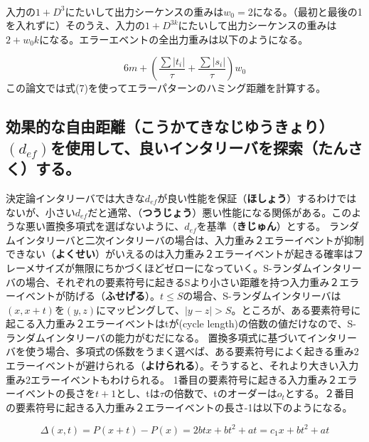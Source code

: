 \documentclass[24 pts]{article}
\begin{document}
\paragraph{}
入力の$1+D^3$にたいして出力シーケンスの重みは$w_0=2$になる。（最初と最後の1を入れずに）そのうえ、入力の$1+D^{3k}$にたいして出力シーケンスの重みは$2+w_0k$になる。エラーエベントの全出力重みは以下のようになる。

\begin{equation}\tag{7}
6m+ \left( \frac{\sum \left|t_i\right|}{\tau}+\frac{\sum \left|s_i\right|}{\tau}\right)w_0
\end{equation}
この論文では式(7)を使ってエラーパターンのハミング距離を計算する。

\subsection{効果的な自由距離（\textbf{こうかてきなじゆうきょり}）$(d_{ef})$を使用して、良いインタリーバを探索（\textbf{たんさく}）する。}
決定論インタリーバでは大きな$d_{ef}$が良い性能を保証（\textbf{ほしょう}）するわけではないが、小さい$d_{ef}$だと通常、（\textbf{つうじょう}）悪い性能になる関係がある。このような悪い置換多項式を選ばないように、$d_{ef}$を基準（\textbf{きじゅん}）とする。
ランダムインタリーバと二次インタリーバの場合は、入力重み２エラーイベントが抑制できない（\textbf{よくせい}）がいえるのは入力重み２エラーイベントが起きる確率はフレーメサイズが無限にちかづくほどゼローになっていく。S-ランダムインタリーバの場合、それぞれの要素符号に起きるSより小さい距離を持つ入力重み２エラーイベントが防げる（\textbf{ふせげる}）。$t\leq S$の場合、S-ランダムインタリーバは$(x,x+t)$を$(y,z)$にマッピングして、$|y-z|>S$。ところが、ある要素符号に起こる入力重み２エラーイベントはtが(cycle length)の倍数の値だけなので、S-ランダムインタリーバの能力がむだになる。
置換多項式に基づいてインタリーバを使う場合、多項式の係数をうまく選べば、ある要素符号によく起きる重み2エラーイベントが避けられる（\textbf{よけられる}）。そうすると、それより大きい入力重み2エラーイベントもわけられる。
1番目の要素符号に起きる入力重み２エラーイベントの長さを$t+1$とし、tは$\tau$の倍数で、tのオーダーは$o_t$とする。２番目の要素符号に起きる入力重み２エラーイベントの長さ-1は以下のようになる。

\begin{equation}\tag{8}
\Delta(x,t)=P(x+t)-P(x)=2btx+bt^2+at=c_1x+bt^2+at 
\end{equation}
\end{document}
